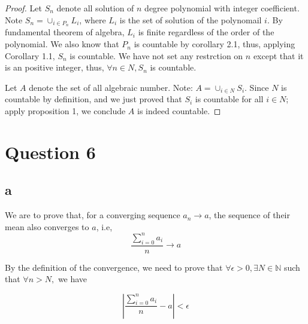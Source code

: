 \documentclass{article}
\theoremstyle{definition}
\theoremstyle{definition}
\theoremstyle{remark}
\begin{document}
\begin{proof}
    Let $S_n$ denote all solution of $n$ degree polynomial with integer coefficient. 
    Note $S_n = \cup_{i\in P_n} L_i$, where $L_i$ is the set of solution of the polynomail $i$. By fundamental theorem of algebra, $L_i$ is finite regardless of the order of the polynomial. We also know that $P_n$ is countable by corollary 2.1, thus, applying Corollary 1.1, $S_n$ is countable. We have not set any restrction on $n$ except that it is an positive integer, thus, $\forall n \in N, S_n$ is countable.

    Let $A$ denote the set of all algebraic number. Note: $A = \cup_{i\in N} S_i$. Since $N$ is countable by definition, and we just proved that $S_i$ is countable for all $i \in N$; apply proposition 1, we conclude $A$ is indeed countable.
\end{proof}

\newpage

\section*{Question 6}

\subsection*{a}

We are to prove that, for a converging sequence $a_n \rightarrow a$, the sequence of their mean also converges to $a$, i.e, 
\begin{equation}
  \label{mean}
\frac{\sum_{i=0}^n a_i }{n} \rightarrow a
\end{equation}

By the definition of the convergence, we need to prove that $\forall \epsilon > 0, \exists N\in \mathbb{N}$ such that $\forall n>N,$
we have

\begin{equation}
  \label{limit}
|\frac{\sum_{i=0}^n a_i }{n} -a | < \epsilon
\end{equation}
\end{document}
